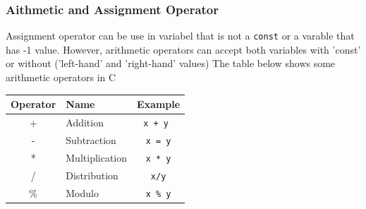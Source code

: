 \subsubsection{Aithmetic and Assignment Operator }
Assignment operator can be use in variabel that is not a \verb*|const| or a varable that has -1 value. However, arithmetic operators can accept both variables with 'const' or without ('left-hand' and 'right-hand' values)
The table below shows some arithmetic operators in C
\begin{center}
	\begin{tabular}{|c|l|c|}
		\hline

		\multicolumn{1}{|l|}{Operator} & Name & \multicolumn{1}{l|}{Example} \\ \hline


		+  & Addition &\verb|x + y |  \\ \hline
		-  & Subtraction &\verb|x = y|   \\ \hline
		*  & Multiplication   & \verb|x * y|  \\ \hline
		/  & Distribution   & \verb|x/y|  \\ \hline
		\% & Modulo     & \verb|x % y| \\ \hline
	\end{tabular}
\end{center}

